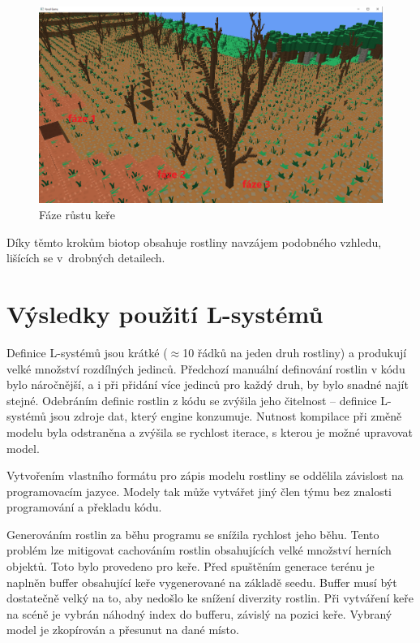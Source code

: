 \documentclass[thesis=M,czech]{FITthesis}[2019/12/23]
\begin{document}
\begin{figure}\centering
	\includegraphics[width=\textwidth]{images/shrub_evolution}
	\caption[Fáze růstu keře]{Fáze růstu keře}\label{fig:shrub_evolution}
\end{figure}

Díky těmto krokům biotop obsahuje rostliny navzájem podobného vzhledu, lišících se v~drobných detailech.

\section{Výsledky použití L-systémů}
Definice L-systémů jsou krátké ($\approx$10 řádků na jeden druh rostliny) a produkují velké množství rozdílných jedinců. Předchozí manuální definování rostlin v kódu bylo náročnější, a i při přidání více jedinců pro každý druh, by bylo snadné najít stejné. Odebráním definic rostlin z kódu se zvýšila jeho čitelnost -- definice L-systémů jsou zdroje dat, který engine konzumuje. Nutnost kompilace při změně modelu byla odstraněna a zvýšila se rychlost iterace, s kterou je možné upravovat model.

Vytvořením vlastního formátu pro zápis modelu rostliny se oddělila zá\-vi\-s\-lost na programovacím jazyce. Modely tak může vytvářet jiný člen týmu bez znalosti programování a překladu kódu.

Generováním rostlin za běhu programu se snížila rychlost jeho běhu. Tento problém lze mitigovat cachováním rostlin obsahujících velké množství herních objektů. Toto bylo provedeno pro keře. Před spuštěním generace terénu je naplněn buffer obsahující keře vygenerované na základě seedu. Buffer musí být dostatečně velký na to, aby nedošlo ke snížení diverzity rostlin. Při vytváření keře na scéně je vybrán náhodný index do bufferu, závislý na pozici keře. Vybraný model je zkopírován a přesunut na dané místo.
\end{document}
